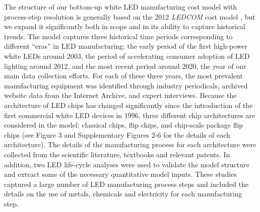 \documentclass[parskip=full]{article}
\begin{document}
The structure of our bottom-up white LED manufacturing cost model with process-step resolution is generally based on the 2012 \textit{LEDCOM} cost model \cite{ledcomv2}, but we expand it significantly both in scope and in its ability to capture historical trends. The model captures three historical time periods corresponding to different “eras” in LED manufacturing: the early period of the first high-power white LEDs around 2003, the period of accelerating consumer adoption of LED lighting around 2012, and the most recent period around 2020, the year of our main data collection efforts. For each of these three years, the most prevalent manufacturing equipment was identified through industry periodicals, archived website data from the Internet Archive, and expert interviews. Because the architecture of LED chips has changed significantly since the introduction of the first commercial white LED devices in 1996, three different chip architectures are considered in the model: classical chips, flip chips, and chip-scale package flip chips (see Figure 3 and Supplementary Figures 2-6 for the details of each architecture). The details of the manufacturing process for each architecture were collected from the scientific literature, textbooks and relevant patents. In addition, two LED life-cycle analyses were used to validate the model structure and extract some of the necessary quantitative model inputs. These studies captured a large number of LED manufacturing process steps and included the details on the use of metals, chemicals and electricity for each manufacturing step.
\end{document}
